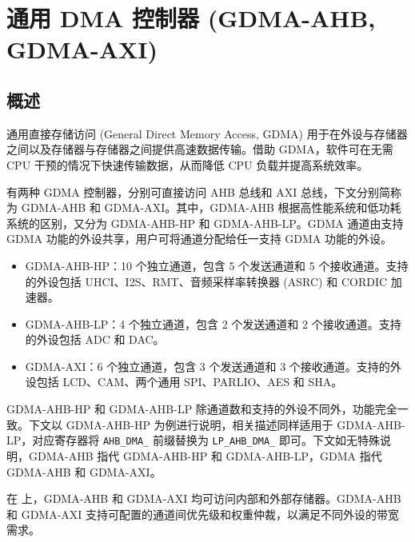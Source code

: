 \documentclass[main\_\_CN.tex]{subfiles}
\begin{document}
\setchineseformatting


\ifglobal
\else
    \clearpage
    \listoftodos
    \listofdonetodos
    \tableofcontents
\fi



\hypertarget{dma}{}
\chapter{通用 DMA 控制器 (GDMA-AHB, GDMA-AXI)}
\label{mod:dma}
\section{概述}

通用直接存储访问 (General Direct Memory Access, GDMA) 用于在外设与存储器之间以及存储器与存储器之间提供高速数据传输。借助 GDMA，软件可在无需 CPU 干预的情况下快速传输数据，从而降低 CPU 负载并提高系统效率。

\chipname{} 有两种 GDMA 控制器，分别可直接访问 AHB 总线和 AXI 总线，下文分别简称为 GDMA-AHB 和 GDMA-AXI。其中，GDMA-AHB 根据高性能系统和低功耗系统的区别，又分为 GDMA-AHB-HP 和 GDMA-AHB-LP。GDMA 通道由支持 GDMA 功能的外设共享，用户可将通道分配给任一支持 GDMA 功能的外设。
\begin{itemize}
    \item GDMA-AHB-HP：10 个独立通道，包含 5 个发送通道和 5 个接收通道。支持的外设包括 UHCI、I2S、RMT、音频采样率转换器 (ASRC) 和 CORDIC 加速器。
    \item GDMA-AHB-LP：4 个独立通道，包含 2 个发送通道和 2 个接收通道。支持的外设包括 ADC 和 DAC。
    \item GDMA-AXI：6 个独立通道，包含 3 个发送通道和 3 个接收通道。支持的外设包括 LCD、CAM、两个通用 SPI、PARLIO、AES 和 SHA。
\end{itemize}


GDMA-AHB-HP 和 GDMA-AHB-LP 除通道数和支持的外设不同外，功能完全一致。下文以 GDMA-AHB-HP 为例进行说明，相关描述同样适用于 GDMA-AHB-LP，对应寄存器将 \texttt{AHB\_DMA\_} 前缀替换为 \texttt{LP\_AHB\_DMA\_} 即可。下文如无特殊说明，GDMA-AHB 指代 GDMA-AHB-HP 和 GDMA-AHB-LP，GDMA 指代 GDMA-AHB 和 GDMA-AXI。

在 \chipname{} 上，GDMA-AHB 和 GDMA-AXI 均可访问内部和外部存储器。GDMA-AHB 和 GDMA-AXI 支持可配置的通道间优先级和权重仲裁，以满足不同外设的带宽需求。
\end{document}

